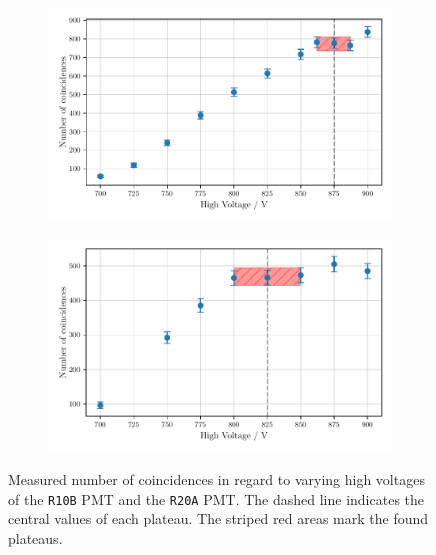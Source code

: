 \begin{figure}
        \centering
        \begin{subfigure}[b]{0.48\textwidth}
        \includegraphics[width=\textwidth]{plots/hvR20A.pdf}
        \label{fig:hvPMT1}
    \end{subfigure}\hfill
\begin{subfigure}[b]{0.48\textwidth}
        \includegraphics[width=\textwidth]{plots/hvR10B.pdf}
        \label{fig:hvPMT2}
\end{subfigure}
\caption{Measured number of coincidences in regard to varying high voltages
of the \texttt{R10B} PMT and the \texttt{R20A} PMT.
The dashed line indicates the central values of each plateau. The striped red areas mark the found plateaus.}
\label{fig:hv}
\end{figure}
